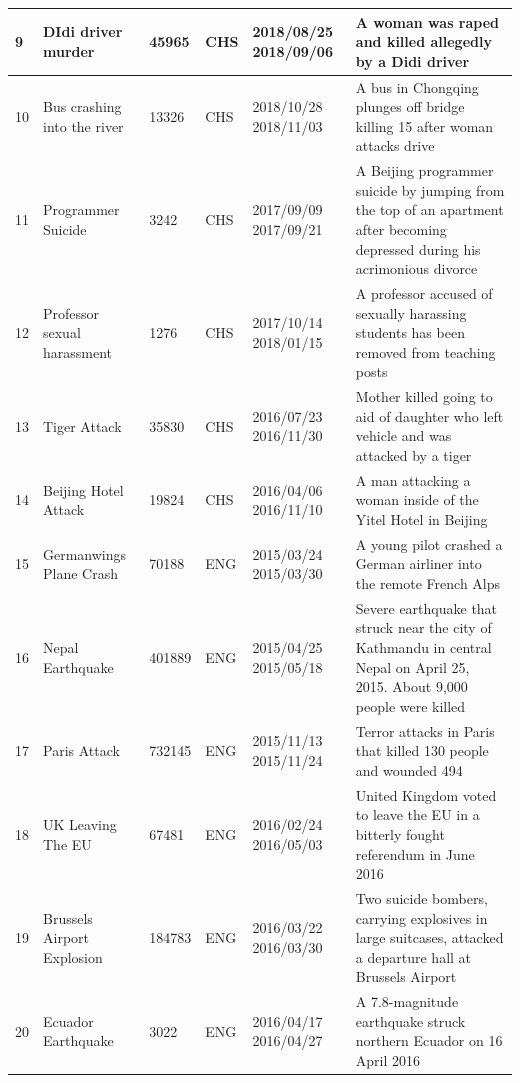 \documentclass[runningheads]{llncs}
\begin{document}
\begin{table}
\begin{center}
\begin{tabular}{m{0.5cm}<{\centering}m{2.0cm}<{\centering}m{1.2cm}<{\centering}m{0.5cm}<{\centering}m{3cm}<{\centering}m{4.5cm}<{\centering}}
9&DIdi driver murder           & 45965    & CHS & 2018/08/25 2018/09/06   & A woman was raped and killed allegedly by a Didi driver                                                                      \\ \hline
10&Bus crashing into the river  & 13326    & CHS & 2018/10/28 2018/11/03   & A bus in Chongqing plunges off bridge killing 15 after woman attacks drive                                                   \\ \hline
11&Programmer Suicide           & 3242     & CHS & 2017/09/09 2017/09/21   & A Beijing programmer suicide by jumping from the top of an apartment after becoming depressed during his acrimonious divorce \\ \hline
12&Professor sexual harassment  & 1276     & CHS & 2017/10/14 2018/01/15   & A professor accused of sexually harassing students has been removed from teaching posts                                      \\ \hline
13&Tiger Attack                 & 35830    & CHS & 2016/07/23 2016/11/30   & Mother killed going to aid of daughter who left vehicle and was attacked by a tiger                                          \\ \hline
14&Beijing Hotel Attack         & 19824    & CHS & 2016/04/06 2016/11/10   & A man attacking a woman inside of the Yitel Hotel in Beijing                                                                 \\ \hline
15&Germanwings Plane Crash         & 70188    & ENG & 2015/03/24 2015/03/30   & A young pilot crashed a German airliner into the remote French Alps                                                       \\ \hline
16&Nepal Earthquake         & 401889    & ENG & 2015/04/25 2015/05/18   & Severe earthquake that struck near the city of Kathmandu in central Nepal on April 25, 2015. About 9,000 people were killed          \\ \hline
17&Paris Attack         & 732145    & ENG & 2015/11/13 2015/11/24   & Terror attacks in Paris that killed 130 people and wounded 494          \\ \hline
18&UK Leaving The EU        & 67481    & ENG & 2016/02/24 2016/05/03   & United Kingdom voted to leave the EU  in a bitterly fought referendum in June 2016          
      \\ \hline
19&Brussels Airport Explosion        & 184783    & ENG & 2016/03/22 2016/03/30  & Two suicide bombers, carrying explosives in large suitcases, attacked a departure hall at Brussels Airport          
      \\ \hline
20&Ecuador Earthquake        & 3022    & ENG & 2016/04/17 2016/04/27 & A 7.8-magnitude earthquake struck northern Ecuador on 16 April 2016          \\ \hline    
\end{tabular}
\end{center}
\label{default}
\end{table}
\end{document}
